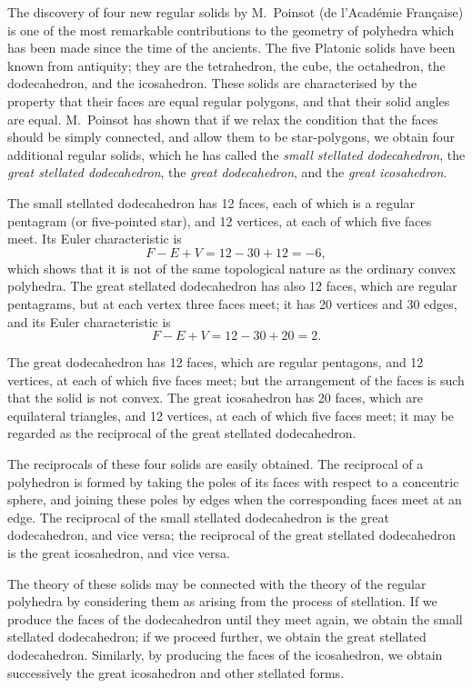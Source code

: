 \documentclass[11pt,a4paper]{book}
\begin{document}
The discovery of four new regular solids by M.~Poinsot (de l'Académie Fran\c{c}aise) is one of the most remarkable contributions to the geometry of polyhedra which has been made since the time of the ancients. The five Platonic solids have been known from antiquity; they are the tetrahedron, the cube, the octahedron, the dodecahedron, and the icosahedron. These solids are characterised by the property that their faces are equal regular polygons, and that their solid angles are equal. M.~Poinsot has shown that if we relax the condition that the faces should be simply connected, and allow them to be star-polygons, we obtain four additional regular solids, which he has called the \textit{small stellated dodecahedron}, the \textit{great stellated dodecahedron}, the \textit{great dodecahedron}, and the \textit{great icosahedron}.

\setcounter{page}{82}

The small stellated dodecahedron has 12 faces, each of which is a regular pentagram (or five-pointed star), and 12 vertices, at each of which five faces meet. Its Euler characteristic is
\[
F - E + V = 12 - 30 + 12 = -6,
\]
which shows that it is not of the same topological nature as the ordinary convex polyhedra. The great stellated dodecahedron has also 12 faces, which are regular pentagrams, but at each vertex three faces meet; it has 20 vertices and 30 edges, and its Euler characteristic is
\[
F - E + V = 12 - 30 + 20 = 2.
\]

The great dodecahedron has 12 faces, which are regular pentagons, and 12 vertices, at each of which five faces meet; but the arrangement of the faces is such that the solid is not convex. The great icosahedron has 20 faces, which are equilateral triangles, and 12 vertices, at each of which five faces meet; it may be regarded as the reciprocal of the great stellated dodecahedron.

\setcounter{page}{83}

The reciprocals of these four solids are easily obtained. The reciprocal of a polyhedron is formed by taking the poles of its faces with respect to a concentric sphere, and joining these poles by edges when the corresponding faces meet at an edge. The reciprocal of the small stellated dodecahedron is the great dodecahedron, and vice versa; the reciprocal of the great stellated dodecahedron is the great icosahedron, and vice versa.

The theory of these solids may be connected with the theory of the regular polyhedra by considering them as arising from the process of stellation. If we produce the faces of the dodecahedron until they meet again, we obtain the small stellated dodecahedron; if we proceed further, we obtain the great stellated dodecahedron. Similarly, by producing the faces of the icosahedron, we obtain successively the great icosahedron and other stellated forms.
\end{document}
